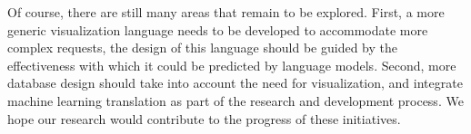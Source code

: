 \documentclass[
	a4paper, %
	10pt, %
	unnumberedsections, %
	twoside, %
]{t0003}
\begin{document}
Of course, there are still many areas that remain to be explored. First, a more generic visualization language needs to be developed to accommodate more complex requests, the design of this language should be guided by the effectiveness with which it could be predicted by language models. Second, more database design should take into account the need for visualization, and integrate machine learning translation as part of the research and development process. We hope our research would contribute to the progress of these initiatives.





\end{document}
